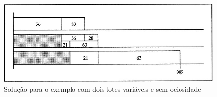 \begin{figure}[!ht]
    \centering
    \includegraphics[scale=0.4]{Referencial/Figuras/Ls_ex3}
    \caption{Solução para o exemplo com dois lotes variáveis e sem ociosidade}
    \label{fig:LS_ex3}
\end{figure}